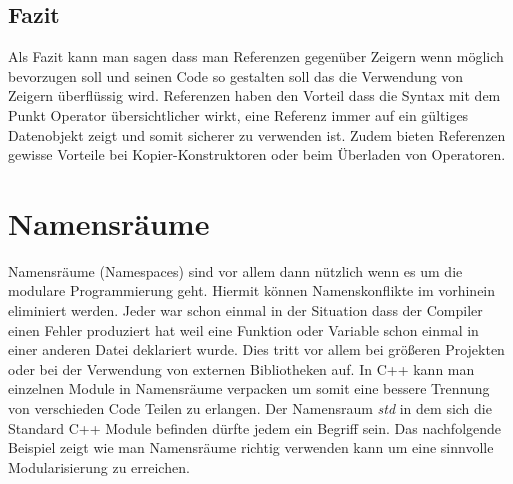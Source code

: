 \documentclass[MES,Master,ngerman]{twbook}%
\begin{document}
\subsection{Fazit}
Als Fazit kann man sagen dass man Referenzen gegenüber Zeigern wenn möglich bevorzugen soll und seinen Code so gestalten soll das die Verwendung von Zeigern überflüssig wird. Referenzen haben den Vorteil dass die Syntax mit dem Punkt Operator übersichtlicher wirkt, eine Referenz immer auf ein gültiges Datenobjekt zeigt und somit sicherer zu verwenden ist. Zudem bieten Referenzen gewisse Vorteile bei Kopier-Konstruktoren oder beim Überladen von Operatoren.
\newpage
\section{Namensräume}
Namensräume (Namespaces) sind vor allem dann nützlich wenn es um die modulare Programmierung geht. Hiermit können Namenskonflikte im vorhinein eliminiert werden. Jeder war schon einmal in der Situation dass der Compiler einen Fehler produziert hat weil eine Funktion oder Variable schon einmal in einer anderen Datei deklariert wurde. Dies tritt vor allem bei größeren Projekten oder bei der Verwendung von externen Bibliotheken auf. In C++ kann man einzelnen Module in Namensräume verpacken um somit eine bessere Trennung von verschieden Code Teilen zu erlangen. Der Namensraum \textit{std} in dem sich die Standard C++ Module befinden dürfte jedem ein Begriff sein. Das nachfolgende Beispiel zeigt wie man Namensräume richtig verwenden kann um eine sinnvolle Modularisierung zu erreichen. \newline
\end{document}
